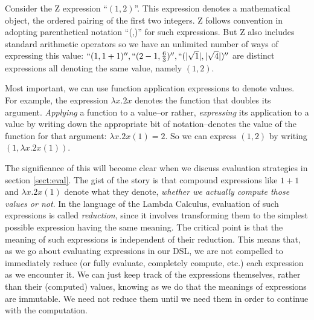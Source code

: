 \documentclass[reqno,12pt]{tufte-handout}
\numberwithin{equation}{subsection}
\numberwithin{equation}{subsection}
\begin{document}
Consider the Z expression ``\((1,2)\)''.  This expression denotes a
mathematical object, the ordered pairing of the first two integers.  Z
follows convention in adopting parenthetical notation ``(,)'' for such
expressions.  But Z also includes standard arithmetic operators so we
have an unlimited number of ways of expressing this value:
\(``(1,1+1)'', ``(2-1,\frac{6}{3})'', ``(|\sqrt{1}|,|\sqrt{4}|)''\)
are distinct expressions all denoting the same value, namely
\((1,2)\).

Most important, we can use function application expressions to denote
values.  For example, the expression \(\lambda x.2x\) denotes the
function that doubles its argument.  \textit{Applying} a function to a
value--or rather, \textit{expressing} its application to a value by
writing down the appropriate bit of notation--denotes the value of the
function for that argument: \(\lambda x.2x(1) = 2\).  So we can
express \((1,2)\) by writing \((1,\lambda x.2x(1))\).

The significance of this will become clear when we discuss evaluation
strategies in section \ref{sect:eval}.  The gist of the story is that
compound expressions like \(1+1\) and \(\lambda x.2x(1)\) denote what
they denote, \textit{whether we actually compute those values or not}.
In the language of the Lambda Calculus, evaluation of such expressions
is called \textit{reduction}, since it involves transforming them to
the simplest possible expression having the same
meaning.  The critical point is that the meaning of such
expressions is independent of their reduction.  This means that, as we
go about evaluating expressions in our DSL, we are not compelled to
immediately reduce (or fully evaluate, completely compute, etc.) each
expression as we encounter it.  We can just keep track of the
expressions themselves, rather than their (computed) values, knowing
as we do that the meanings of expressions are immutable.  We need not
reduce them until we need them in order to continue with the computation.
\end{document}
